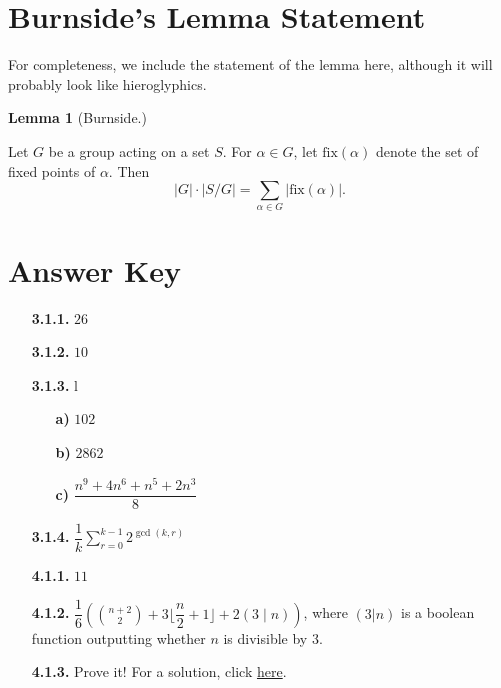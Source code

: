 \documentclass[11pt]{scrartcl}
\begin{document}
\section{Burnside's Lemma Statement}

For completeness, we include the statement of the lemma here, although it will probably look like hieroglyphics.

\begin{tcolorbox}[colback=orange!5!white,colframe=orange!75!black]
  \color{orange} \textbf{Lemma 1} (Burnside.)\color{black}
  \vspace{0.1cm}
  
  Let $G$ be a group acting on a set $S$. For $\alpha \in G$, let $\text{fix}(\alpha)$ denote the set of fixed points of $\alpha$. Then\[\lvert G \rvert \cdot \lvert S/G \rvert = \sum_{\alpha \in G} \lvert \text{fix}(\alpha) \rvert .\]
\end{tcolorbox}

\newpage

\section{Answer Key}

\begin{enumerate}
    \item[\textbf{3.1.1.}] $26$
    \item[\textbf{3.1.2.}] $10$
    \item[\textbf{3.1.3.}] \color{white} l \color{black}
    \begin{enumerate}
    \item[\textbf{a)}] $102$
    \item[\textbf{b)}] $2862$
    \item[\textbf{c)}] $\dfrac{n^9+4n^6+n^5+2n^3}{8}$
    \end{enumerate}
    \item[\textbf{3.1.4.}] $\dfrac{1}{k}\displaystyle\sum_{r=0}^{k-1}2^{\gcd(k,r)}$
    \item[\textbf{4.1.1.}] $11$
    \item[\textbf{4.1.2.}] $\dfrac{1}{6}\left(\displaystyle\binom{n+2}{2}+3\lfloor{\dfrac{n}{2}+1}\rfloor+2(3 \mid n)\right)$, where $(3|n)$ is a boolean function outputting whether $n$ is divisible by $3$.
    \item[\textbf{4.1.3.}] Prove it! For a solution, click \href{https://math.stackexchange.com/a/16631}{here}.
\end{enumerate}
\end{document}
